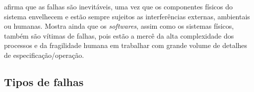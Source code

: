  afirma que as falhas são inevitáveis, uma vez que os
componentes físicos do sistema envelhecem e estão sempre sujeitos as
interferências externas, ambientais ou humanas. Mostra ainda que os {\it
softwares}, assim como os sistemas físicos, também são vítimas de falhas, pois
estão a mercê da alta complexidade dos processos e da fragilidade humana em
trabalhar com grande volume de detalhes de especificação/operação.

\subsection{Tipos de falhas}


